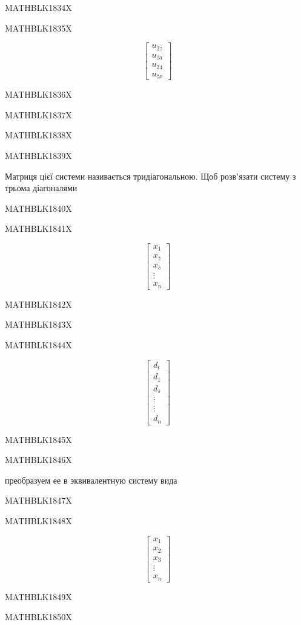 \documentclass[
  ukrainian,
]{article}
\begin{document}
MATHBLK1834X

MATHBLK1835X

\[
\begin{bmatrix} u_{2\bar{z}} \\ u_{\bar{z}a} \\ u_{24} \\ u_{\bar{z}x} \end{bmatrix}
\]

MATHBLK1836X

MATHBLK1837X

MATHBLK1838X

MATHBLK1839X

Матриця цієї системи називається тридіагональною. Щоб розв'язати систему
з трьома діагоналями

MATHBLK1840X

MATHBLK1841X

\[
\begin{bmatrix} x_1 \\ x_{\bar{z}} \\ x_{\bar{s}} \\ \vdots \\ x_n \end{bmatrix}
\]

MATHBLK1842X

MATHBLK1843X

MATHBLK1844X

\[
\begin{bmatrix} d_t \\ d_{\bar{z}} \\ d_{\bar{s}} \\ \vdots \\ \vdots \\ d_n \end{bmatrix}
\]

MATHBLK1845X

MATHBLK1846X

преобразуем ее в эквивалентную систему вида

MATHBLK1847X

MATHBLK1848X

\[
\begin{bmatrix} x_1 \\ x_2 \\ x_3 \\ \vdots \\ x_n \end{bmatrix}
\]

MATHBLK1849X

MATHBLK1850X
\end{document}

